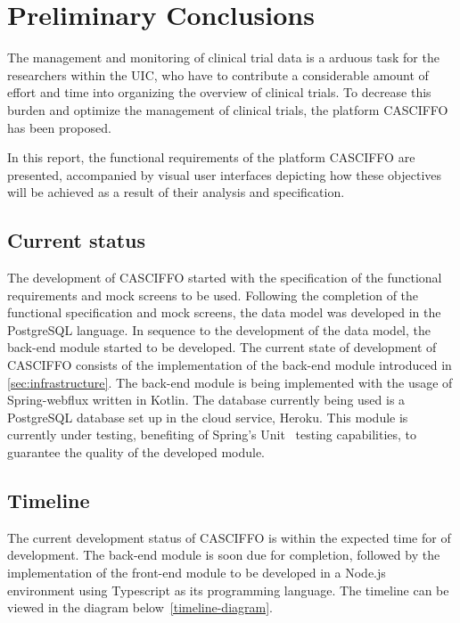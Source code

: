 \chapter{Preliminary Conclusions}
The management and monitoring of clinical trial data is a arduous task for the researchers within the UIC, who have to contribute a considerable amount of effort and time into organizing the overview of clinical trials. To decrease this burden and optimize the management of clinical trials, the platform CASCIFFO has been proposed.

In this report, the functional requirements of the platform CASCIFFO are presented, accompanied by visual user interfaces depicting how these objectives will be achieved as a result of their analysis and specification.

\section{Current status}
The development of CASCIFFO started with the specification of the functional requirements and mock screens to be used. Following the completion of the functional specification and mock screens, the data model was developed in the PostgreSQL language. In sequence to the development of the data model, the back-end module started to be developed.
The current state of development of CASCIFFO consists of the implementation of the back-end module introduced in \ref{sec:infrastructure}. The back-end module is being implemented with the usage of Spring-webflux written in Kotlin. The database currently being used is a PostgreSQL database set up in the cloud service, Heroku. This module is currently under testing, benefiting of Spring's Unit~\cite{spring-testing-unit} testing capabilities, to guarantee the quality of the developed module.

\section{Timeline}
The current development status of CASCIFFO is within the expected time for of development. The back-end module is soon due for completion, followed by the implementation of the front-end module to be developed in a Node.js environment using Typescript as its programming language. The timeline can be viewed in the diagram below~\ref{timeline-diagram}.

\pagebreak
\begin{landscape}~\label{timeline-diagram}
\centering
\vspace*{\fill}
\vfill
\end{landscape}

